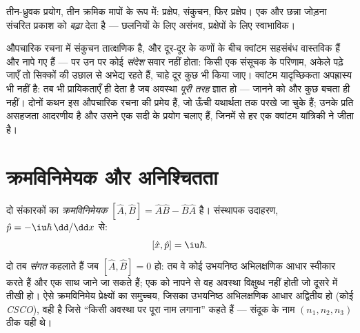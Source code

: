 \begin{omfigure}

{\small तीन-ध्रुवक प्रयोग, तीन क्रमिक मापों के रूप में: प्रक्षेप,
संकुचन, फिर प्रक्षेप। एक और छन्ना जोड़ना संचरित प्रकाश को
\emph{बढ़ा} देता है --- छलनियों के लिए असंभव, प्रक्षेपों के लिए
स्वाभाविक।}
\end{omfigure}

\begin{remark}[संकुचन किसकी अनुमति नहीं देता]\label{rem:b3:quantum-formalism:nosignal}
औपचारिक रचना में संकुचन तात्क्षणिक है, और दूर-दूर के कणों के बीच क्वांटम
सहसंबंध वास्तविक हैं और नापे गए हैं --- पर उन पर कोई
\emph{संदेश} सवार नहीं होता: किसी एक संसूचक के परिणाम, अकेले पढ़े जाएँ
तो सिक्कों की उछाल से अभेद्य रहते हैं, चाहे दूर कुछ भी किया जाए।
क्वांटम यादृच्छिकता अपह्रास्य भी नहीं है:  तब भी
प्रायिकताएँ ही देता है जब अवस्था \emph{पूरी तरह} ज्ञात हो --- जानने को
और कुछ बचता ही नहीं। दोनों कथन इस औपचारिक रचना की प्रमेय हैं, जो ऊँची
यथार्थता तक परखे जा चुके हैं; उनके प्रति असहजता आदरणीय है और उसने एक
सदी के प्रयोग चलाए हैं, जिनमें से हर एक क्वांटम यांत्रिकी ने जीता है।
\end{remark}

\section{क्रमविनिमेयक और अनिश्चितता}

\begin{definition}[क्रमविनिमेयक; संगत प्रेक्ष्य]\label{def:b3:quantum-formalism:commutator}
दो संकारकों का \emph{क्रमविनिमेयक} $[\hat A, \hat B] = \hat
A\hat B - \hat B\hat A$ है। संस्थापक उदाहरण, $\hat p =
-\iu\hbar\,\dd/\dd x$ से:
\[
[\hat x, \hat p] = \iu\hbar .
\]
दो  तब \emph{संगत} कहलाते हैं जब $[\hat A, \hat B] = 0$ हो:
तब वे कोई उभयनिष्ठ अभिलक्षणिक आधार स्वीकार करते हैं और एक साथ जाने जा
सकते हैं; एक को नापने से वह अवस्था विक्षुब्ध नहीं होती जो दूसरे में
तीखी हो। ऐसे क्रमविनिमेय प्रेक्ष्यों का समुच्चय, जिसका उभयनिष्ठ
अभिलक्षणिक आधार अद्वितीय हो (कोई
\emph{CSCO}), वही है जिसे ``किसी अवस्था पर पूरा नाम लगाना'' कहते हैं ---
संदूक के नाम $(n_1, n_2, n_3)$ ठीक यही थे।
\end{definition}


